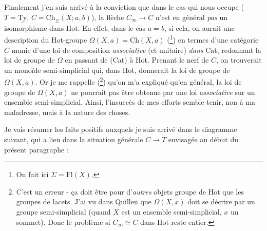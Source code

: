 \documentclass[11pt]{article}
\newcommand{\msp}[1]{\marginpar{\vspace*{10pt}\footnotesize [#1]}}
\newcommand{\Ch}{\underline{\mathrm{Ch}}}
\newcommand{\Ty}{\underline{\mathrm{Ty}}}
\begin{document}
Finalement j'en suis arrivé à la conviction que dans le cas qui nous occupe ($T = \Ty$, $C = \Ch_{\Sigma}(X;a,b)$), la flèche $C_{\infty} \longrightarrow C$ n'est en général \textit{pas} un isomorphisme dans Hot. En effet, dans le cas $a = b$, si cela,
\msp{page 113}
on aurait une description du Hot-groupe $\Omega(X,a) = \Ch(X,a)$ (\footnote[23]{On fait ici $\Sigma = \mathrm{Fl}(X)$.}) en termes d'une catégorie $C$ munie d'une loi de composition \textit{associative} (et unitaire) \textit{dans} Cat, redonnant la loi de groupe de $\Omega$ en passant de (Cat) à Hot. Prenant le nerf de $C$, on trouverait un monoïde semi-simplicial qui, dans Hot, donnerait la loi de groupe de $\Omega(X,a)$. Or je me rappelle (\footnote[24]{C'est un erreur - ça doit être pour d'\textit{autres} objets groupe de Hot que les groupes de lacets. J'ai vu dans Quillen que $\Omega(X,x)$ doit se décrire par un groupe semi-simplicial (quand $X$ est un ensemble semi-simplicial, $x$ un sommet). Donc le problème si $C_{\infty} \simeq C$ dans Hot reste entier.}) qu'on m'a expliqué qu'en général, la loi de groupe de $\Omega(X,a)$ ne pourrait pas être obtenue par une loi \textit{associative} sur un ensemble semi-simplicial. Ainsi, l'insuccès de mes efforts semble tenir, non à ma maladresse, mais à la nature des choses. %

Je vais résumer les faits positifs auxquels je suis arrivé dans le diagramme suivant, qui a lieu dans la situation générale $C \longrightarrow T$ envisagée au début du présent paragraphe :
\end{document}
